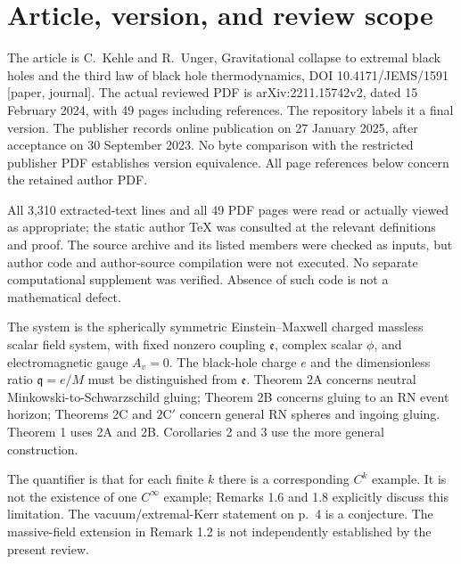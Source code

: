 \documentclass[10pt]{article}
\begin{document}
\section*{Article, version, and review scope}
The article is C. Kehle and R. Unger, Gravitational collapse to extremal black holes and the third law of black hole thermodynamics, DOI 10.4171/JEMS/1591 [paper, journal]. The actual reviewed PDF is arXiv:2211.15742v2, dated 15 February 2024, with 49 pages including references. The repository labels it a final version. The publisher records online publication on 27 January 2025, after acceptance on 30 September 2023. No byte comparison with the restricted publisher PDF establishes version equivalence. All page references below concern the retained author PDF.\par
All 3,310 extracted-text lines and all 49 PDF pages were read or actually viewed as appropriate; the static author TeX was consulted at the relevant definitions and proof. The source archive and its listed members were checked as inputs, but author code and author-source compilation were not executed. No separate computational supplement was verified. Absence of such code is not a mathematical defect.\par
The system is the spherically symmetric Einstein–Maxwell charged massless scalar field system, with fixed nonzero coupling \(\mathfrak e\), complex scalar \(\phi\), and electromagnetic gauge \(A_v=0\). The black-hole charge \(e\) and the dimensionless ratio \(\mathfrak q=e/M\) must be distinguished from \(\mathfrak e\). Theorem 2A concerns neutral Minkowski-to-Schwarzschild gluing; Theorem 2B concerns gluing to an RN event horizon; Theorems 2C and \(2\mathrm C'\) concern general RN spheres and ingoing gluing. Theorem 1 uses 2A and 2B. Corollaries 2 and 3 use the more general construction.\par
The quantifier is that for each finite \(k\) there is a corresponding \(C^k\) example. It is not the existence of one \(C^\infty\) example; Remarks 1.6 and 1.8 explicitly discuss this limitation. The vacuum/extremal-Kerr statement on p. 4 is a conjecture. The massive-field extension in Remark 1.2 is not independently established by the present review.\par
\end{document}
